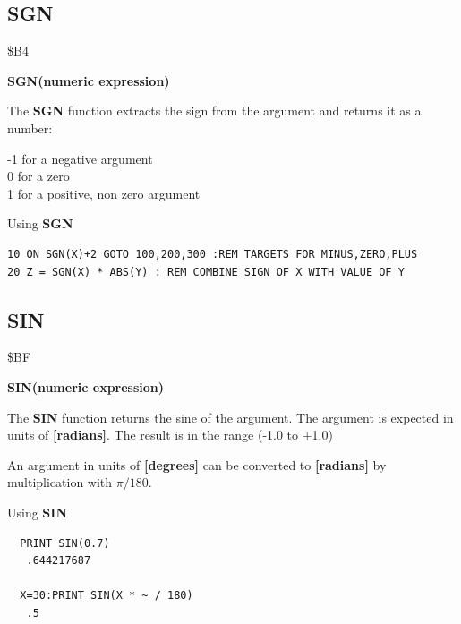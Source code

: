 
\newpage
\subsection{SGN}
\begin{description}[leftmargin=2cm,style=nextline]
\item [Token:] \$B4
\item [Format:] {\bf SGN(numeric expression)}
\item [Usage:] The {\bf SGN} function extracts the sign from
               the argument and returns it as a number:

               -1 for a negative argument \\
                0 for a zero              \\
                1 for a positive, non zero argument

\item [Example:] Using {\bf SGN}
\begin{tcolorbox}[colback=black,coltext=white]
\verbatimfont{\codefont}
\begin{verbatim}
10 ON SGN(X)+2 GOTO 100,200,300 :REM TARGETS FOR MINUS,ZERO,PLUS
20 Z = SGN(X) * ABS(Y) : REM COMBINE SIGN OF X WITH VALUE OF Y
\end{verbatim}
\end{tcolorbox}
\end{description}


\newpage
\subsection{SIN}
\begin{description}[leftmargin=2cm,style=nextline]
\item [Token:] \$BF
\item [Format:] {\bf SIN(numeric expression)}
\item [Usage:] The {\bf SIN} function returns the sine of the
               argument.
               The argument is expected in units of {\bf [radians]}.
               The result is in the range (-1.0 to +1.0)

\item [Remarks:] An argument in units of {\bf [degrees]}
                 can be converted to {\bf [radians]}
               by multiplication with $\pi/180$.
\item [Example:] Using {\bf SIN}
\begin{tcolorbox}[colback=black,coltext=white]
\verbatimfont{\codefont}
\begin{verbatim}
  PRINT SIN(0.7)
   .644217687

  X=30:PRINT SIN(X * ~ / 180)
   .5
\end{verbatim}
\end{tcolorbox}
\end{description}

